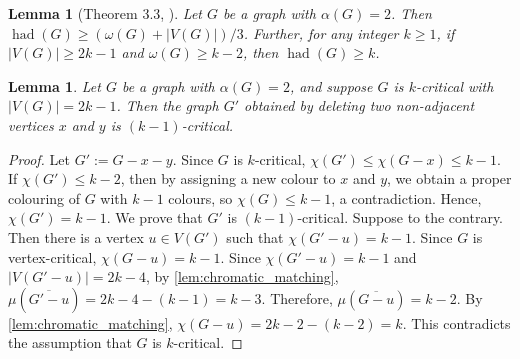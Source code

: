 \documentclass[11pt]{article}
\numberwithin{equation}{section}
\theoremstyle{plain}
\newtheorem{lem}[equation]{Lemma}
\theoremstyle{definition}
\renewcommand{\geq}{\geqslant}
\renewcommand{\leq}{\leqslant}
\DeclareMathOperator{\had}{had}
\begin{document}
\begin{lem}[Theorem 3.3, \citep{PST03}]
    \label{lem:first_seagull} Let $G$ be a graph with $\alpha(G) = 2$. Then $\had(G) \geq (\omega(G) + |V(G)|) / 3$. Further, for any integer $k \geq 1$, if $|V(G)| \geq 2k - 1$ and $\omega(G) \geq k - 2$, then $\had(G) \geq k$.
\end{lem}
\begin{lem}
    \label{lem:non_adj_vtx_crit}
    Let $G$ be a graph with $\alpha(G) = 2$, and suppose $G$ is $k$-critical with $|V(G)| = 2k - 1$. Then the graph $G'$ obtained by deleting two non-adjacent vertices $x$ and $y$  is $(k-1)$-critical.
\end{lem}

\begin{proof}
    Let $G' := G - x - y$.
    Since $G$ is $k$-critical, $\chi(G') \leq \chi(G - x) \leq k -1$. If $\chi(G') \leq k -2$, then by assigning a new colour to $x$ and $y$, we obtain a proper colouring of $G$ with $k-1$ colours, so $\chi(G) \leq k -1$, a contradiction. Hence, $\chi(G') = k-1$. We prove that $G'$ is $(k-1)$-critical. Suppose to the contrary. Then there is a vertex $u \in V(G')$ such that $\chi(G' -u) = k-1$. Since $G$ is vertex-critical, $\chi(G - u) = k-1$.
    Since $\chi(G' - u) = k - 1$ and $|V(G' - u)| = 2k - 4$, by \cref{lem:chromatic_matching}, $\mu(\overline{G' - u}) = 2k - 4 - (k-1) = k- 3$. Therefore, $\mu(\overline{G - u}) = k - 2$. By \cref{lem:chromatic_matching}, $\chi(G - u) = 2k - 2- (k-2) = k$. This contradicts the assumption that $G$ is $k$-critical.
\end{proof}
\end{document}
